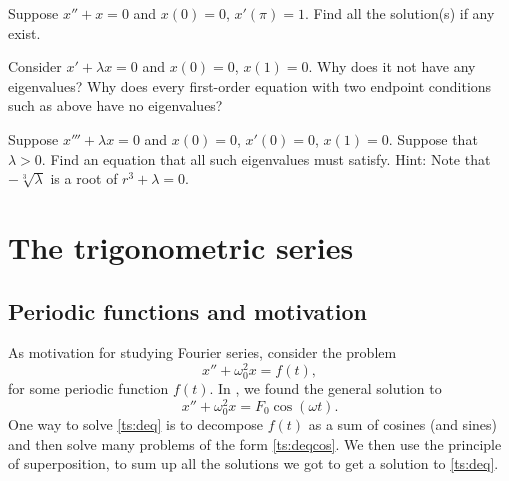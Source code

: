 \begin{exercise}
Suppose $x'' + x = 0$ and $x(0)=0$, $x'(\pi) = 1$.
Find all the solution(s) if any exist.
\end{exercise}

\begin{exercise}
Consider
$x' + \lambda x = 0$ and $x(0)=0$, $x(1) = 0$.  Why does it not
have any eigenvalues?  Why does every first-order equation with two endpoint
conditions such as above have no eigenvalues?
\end{exercise}

\begin{exercise}[challenging]
Suppose $x''' + \lambda x = 0$ and $x(0)=0$, $x'(0) = 0$, $x(1) = 0$.
Suppose that $\lambda > 0$.  Find an equation that all such
eigenvalues must satisfy.
Hint: Note that $-\sqrt[3]{\lambda}$ is a root
of $r^3+\lambda = 0$.
\end{exercise}


\sectionnewpage
\section{The trigonometric series} \label{ts:section}



\subsection{Periodic functions and motivation}

As motivation for studying Fourier series, consider the problem
\begin{equation} \label{ts:deq}
x'' + \omega_0^2 x = f(t) ,
\end{equation}
for some periodic function $f(t)$.
In , we found the general solution to
\begin{equation} \label{ts:deqcos}
x'' + \omega_0^2 x = F_0 \cos ( \omega t) .
\end{equation}
One way to solve \eqref{ts:deq} is to
decompose $f(t)$ as a sum of cosines (and sines) and then
solve many problems of the form \eqref{ts:deqcos}.  We then use
the principle of superposition, to sum up all the solutions we got
to get a solution to \eqref{ts:deq}.

